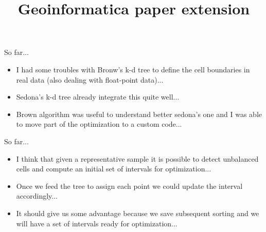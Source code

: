 \documentclass{beamer}
\makeatletter
\newcommand\makebeamertitle{\frame{\maketitle}}%
\let\origtableofcontents=\tableofcontents
\def\tableofcontents{\@ifnextchar[{\origtableofcontents}{\gobbletableofcontents}}
\def\gobbletableofcontents#1{\origtableofcontents}
\makeatother
\begin{document}
\title[SDCEL report]{Geoinformatica paper extension}
\author[AC]{}
\makebeamertitle
\newif\iflattersubsect


\AtBeginSubsection[] {
  \begin{frame}<beamer>
    \frametitle{Outline} 
    \tableofcontents[currentsubsection]  
  \end{frame}
}

\begin{frame}{So far...}
  \begin{itemize}
    \item I had some troubles with Bronw's k-d tree to define the cell boundaries in real data (also dealing with float-point data)...
    \item Sedona's k-d tree already integrate this quite well...
    \item Brown algorithm was useful to understand better sedona's one and I was able to move part of the optimization to a custom code...
  \end{itemize}
\end{frame}

\begin{frame}{So far...}
  \begin{itemize}
    \item I think that given a representative sample it is possible to detect unbalanced cells and compute an initial set of intervals for optimization...
    \item Once we feed the tree to assign each point we could update the interval accordingly...
    \item It should give us some advantage because we save subsequent sorting and we will have a set of intervals ready for optimization...
  \end{itemize}
\end{frame}

\end{document}
